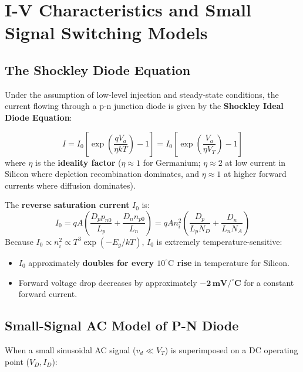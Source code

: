 \documentclass[12pt,a4paper]{article}
\begin{document}
\section{I-V Characteristics and Small Signal Switching Models}

\subsection{The Shockley Diode Equation}
Under the assumption of low-level injection and steady-state conditions, the current flowing through a p-n junction diode is given by the \textbf{Shockley Ideal Diode Equation}:

\begin{tcolorbox}[formulabox, title={\textbf{Shockley Diode Equation and Reverse Saturation Current}}]
\begin{equation}
  I = I_0 \left[ \exp\left(\frac{q V_a}{\eta k T}\right) - 1 \right] = I_0 \left[ \exp\left(\frac{V_a}{\eta V_T}\right) - 1 \right]
\end{equation}
where $\eta$ is the \textbf{ideality factor} ($\eta \approx 1$ for Germanium; $\eta \approx 2$ at low current in Silicon where depletion recombination dominates, and $\eta \approx 1$ at higher forward currents where diffusion dominates).

The \textbf{reverse saturation current} $I_0$ is:
\begin{equation}
  I_0 = q A \left( \frac{D_p p_{n0}}{L_p} + \frac{D_n n_{p0}}{L_n} \right) = q A n_i^2 \left( \frac{D_p}{L_p N_D} + \frac{D_n}{L_n N_A} \right)
\end{equation}
Because $I_0 \propto n_i^2 \propto T^3 \exp(-E_g / kT)$, $I_0$ is extremely temperature-sensitive:
\begin{itemize}[leftmargin=*, itemsep=2pt, topsep=0pt]
  \item $I_0$ approximately \textbf{doubles for every $10^\circ\text{C}$ rise} in temperature for Silicon.
  \item Forward voltage drop decreases by approximately $\mathbf{-2\,\text{mV/}^\circ\text{C}}$ for a constant forward current.
\end{itemize}
\end{tcolorbox}

\subsection{Small-Signal AC Model of P-N Diode}
When a small sinusoidal AC signal ($v_d \ll V_T$) is superimposed on a DC operating point ($V_D, I_D$):
\end{document}
